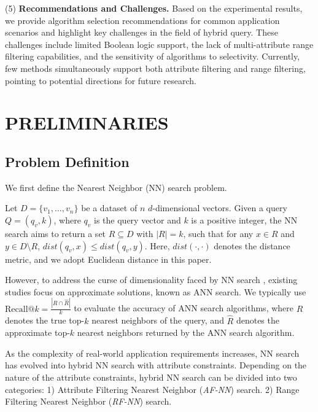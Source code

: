 \documentclass[sigconf, nonacm, pdfa]{acmart}
\begin{document}
	
	{(5)\textbf{ Recommendations and Challenges.}
	Based on the experimental results, we provide algorithm selection recommendations for common application scenarios and highlight key challenges in the field of hybrid query. These challenges include limited Boolean logic support, the lack of multi-attribute range filtering capabilities, and the sensitivity of algorithms to selectivity. Currently, few methods simultaneously support both attribute filtering and range filtering, pointing to potential directions for future research.
	
	\section{PRELIMINARIES}
	
	\subsection{Problem Definition}
	
	We first define the Nearest Neighbor (NN) search problem.
	
	\begin{definition}[NN Search]
		
		Let \( D = \{v_1, \ldots, v_n\} \) be a dataset of \( n \) \( d \)-dimensional vectors. Given a query \( Q = (q_v, k) \), where \( q_v \) is the query vector and \( k \) is a positive integer, the NN search aims to return a set \( R \subseteq D \) with \( |R| = k \), such that for any \( x \in R \) and \( y \in D \setminus R \), \( \textit{dist}\!\left(q_v, x\right) \leq \textit{dist}\!\left(q_v, y\right) \). Here, \( \textit{dist}\!\left(\cdot, \cdot\right) \) denotes the distance metric, and we adopt Euclidean distance in this paper.
	\end{definition}
	
	However, to address the curse of dimensionality faced by NN search \cite{dimcurse}, existing studies focus on approximate solutions, known as ANN  search. We typically use $\text{Recall}@k = \frac{|R \cap \hat{R}|}{k}$ to evaluate the accuracy of ANN search algorithms, where $R$ denotes the true top-$k$ nearest neighbors of the query, and $\hat{R}$ denotes the approximate top-$k$ nearest neighbors returned by the ANN search algorithm.
	
	As the complexity of real-world application requirements increases, NN search has evolved into hybrid NN search with attribute constraints. Depending on the nature of the attribute constraints, hybrid NN search can be divided into two categories: 1) Attribute Filtering Nearest Neighbor (\textit{AF-NN}) search. 2) Range Filtering Nearest Neighbor (\textit{RF-NN}) search. 
	
}
\end{document}
